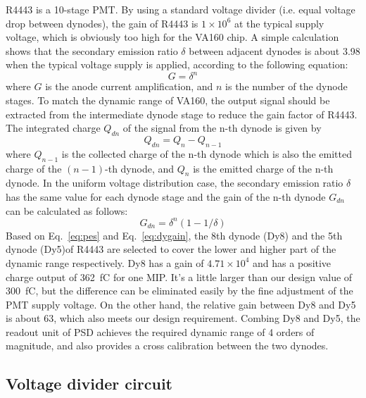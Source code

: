 \documentclass[preprint, times]{elsarticle}
\begin{document}
R4443 is a 10-stage PMT. 
By using a standard voltage divider (i.e. equal voltage drop between dynodes), the gain of R4443 is $1\times10^6$ at the typical supply voltage, which is obviously too high for the VA160 chip. 
A simple calculation shows that the secondary emission ratio $\delta$ between adjacent dynodes is about 3.98 when the typical voltage supply is applied,  according to the following equation:
\begin{equation}
G=\delta^{n}
\label{eq:gain}
\end{equation}
where $G$ is the anode current amplification, and $n$ is the number of the dynode stages. 
To match the dynamic range of VA160, the output signal should be extracted from the intermediate dynode stage to reduce the gain factor of R4443. 
The integrated charge $Q_{dn}$ of the signal from the n-th dynode is given by
\begin{equation}
Q_{dn}=Q_{n}-Q_{n-1}
\label{eq:dycharge}
\end{equation}
where $Q_{n-1}$ is the collected charge of the n-th dynode which is also the emitted charge of the $(n-1)$-th dynode, and $Q_{n}$ is the emitted charge of the n-th dynode. 
In the uniform voltage distribution case, the secondary emission ratio $\delta$ has the same value for each dynode stage and the gain of the n-th dynode $G_{dn}$ can be calculated as follows:
\begin{equation}
G_{dn}=\delta^{n}(1-1/\delta)
\label{eq:dygain}
\end{equation}
Based on Eq.~\ref{eq:pes} and  Eq.~\ref{eq:dygain}, the 8th dynode (Dy8) and the 5th dynode (Dy5)of R4443 are selected to cover the lower and higher part of the dynamic range respectively.
Dy8 has a gain of $4.71\times10^4$ and has a positive charge output of \SI{362} {\femto\coulomb} for one MIP. 
It's a little larger than our design value of \SI{300} {\femto\coulomb}, but the difference can be eliminated easily by the fine adjustment of the PMT supply voltage. 
On the other hand, the relative gain between Dy8 and Dy5 is about 63, which also meets our design requirement.
Combing Dy8 and Dy5, the readout unit of PSD achieves the required dynamic range of 4 orders of magnitude, and also provides a cross calibration between the two dynodes.

\subsection{Voltage divider circuit}
\label{sec:divider_design}
\end{document}
